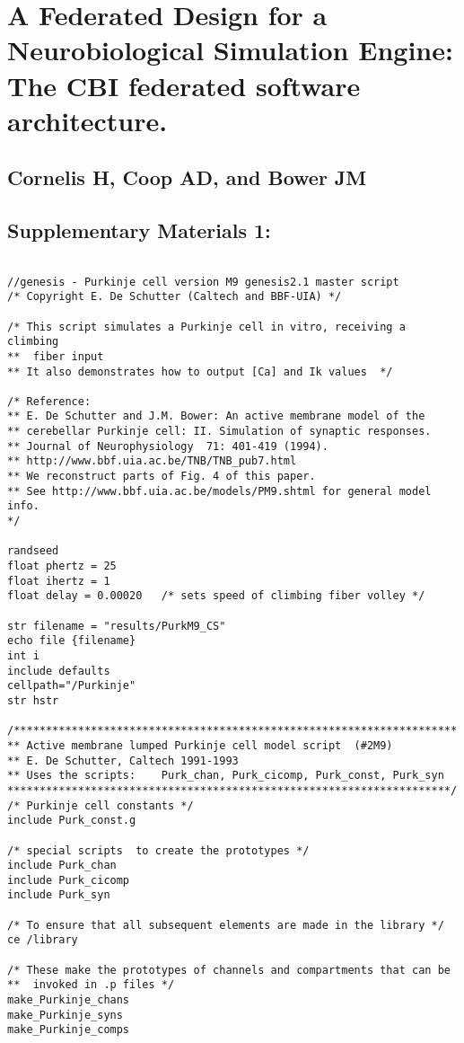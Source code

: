 \documentclass[10pt]{article}
\begin{document}
\section*{A Federated Design for a Neurobiological Simulation Engine: 
The CBI federated software architecture.}
\subsection*{Cornelis H, Coop AD, and Bower JM}
\subsection*{Supplementary Materials 1:} 

\begin{verbatim}

//genesis - Purkinje cell version M9 genesis2.1 master script
/* Copyright E. De Schutter (Caltech and BBF-UIA) */

/* This script simulates a Purkinje cell in vitro, receiving a climbing
**  fiber input 
** It also demonstrates how to output [Ca] and Ik values  */

/* Reference:
** E. De Schutter and J.M. Bower: An active membrane model of the
** cerebellar Purkinje cell: II. Simulation of synaptic responses.
** Journal of Neurophysiology  71: 401-419 (1994).
** http://www.bbf.uia.ac.be/TNB/TNB_pub7.html
** We reconstruct parts of Fig. 4 of this paper.
** See http://www.bbf.uia.ac.be/models/PM9.shtml for general model info.
*/

randseed 
float phertz = 25
float ihertz = 1
float delay = 0.00020	/* sets speed of climbing fiber volley */

str filename = "results/PurkM9_CS"
echo file {filename}
int i
include defaults
cellpath="/Purkinje"
str hstr

/*********************************************************************
** Active membrane lumped Purkinje cell model script  (#2M9)
** E. De Schutter, Caltech 1991-1993 
** Uses the scripts:	Purk_chan, Purk_cicomp, Purk_const, Purk_syn
*********************************************************************/
/* Purkinje cell constants */
include Purk_const.g 

/* special scripts  to create the prototypes */
include Purk_chan 
include Purk_cicomp
include Purk_syn 

/* To ensure that all subsequent elements are made in the library */
ce /library

/* These make the prototypes of channels and compartments that can be
**  invoked in .p files */
make_Purkinje_chans
make_Purkinje_syns
make_Purkinje_comps


\end{verbatim}
\end{document}
